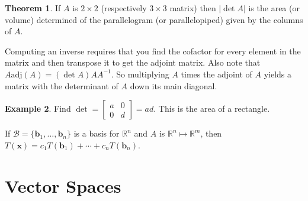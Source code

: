 \documentclass{article}
\numberwithin{equation}{section}
\theoremstyle{definition}
\newtheorem{thm}{Theorem}[subsection]
\newtheorem{ex}[thm]{Example}
\newcommand{\R}{\mathbb{R}}
\newcommand{\x}{\times}
\theoremstyle{adefn}
\begin{document}
	\begin{thm}
		If $A$ is $2 \x 2$ (respectively $3 \x 3$ matrix) then $|\det A|$ is the area (or volume) determined of the parallelogram (or parallelopiped) given by the columns of $A$. 
	\end{thm}
	Computing an inverse requires that you find the cofactor for every element in the matrix and then transpose it to get the adjoint matrix. Also note that $A\text{adj}(A) = (\det A)AA^{-1}$. So multiplying $A$ times the adjoint of $A$ yields a matrix with the determinant of $A$ down its main diagonal. 
	\begin{ex}
		Find $\det = \begin{bmatrix}
			a & 0 \\ 0 & d
		\end{bmatrix} = ad$. This is the area of a rectangle. 
	\end{ex}
	If $\mathcal{B} = \{ \mathbf{b}_1, \ldots, \mathbf{b}_n \}$ is a basis for $\R^n$ and $A$ is $\R^n \mapsto \R^m$, then $T(\mathbf{x}) = c_1 T(\mathbf{b}_1) + \cdots + c_n T(\mathbf{b}_n)$.
	
	\section{Vector Spaces}
	
\end{document}
